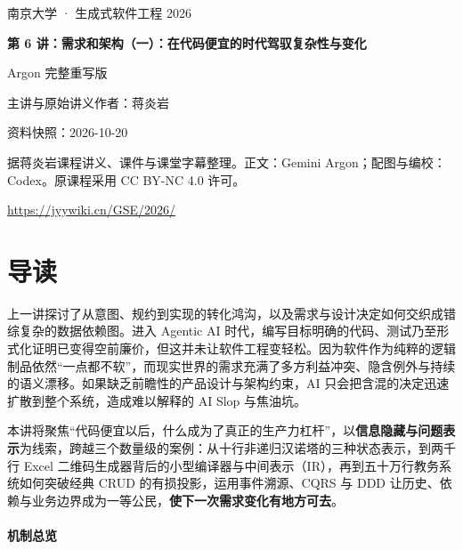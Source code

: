 \documentclass[UTF8,a4paper,11pt,fontset=fandol]{ctexart}
\begin{document}
\begin{titlepage}\centering\vspace*{25mm}

{\Large 南京大学 · 生成式软件工程 2026\par}\vspace{12mm}

{\Huge\bfseries 第 6 讲：需求和架构（一）：在代码便宜的时代驾驭复杂性与变化\par}\vspace{10mm}

{\Large Argon 完整重写版\par}\vspace{10mm}

主讲与原始讲义作者：蒋炎岩\par

资料快照：2026-10-20\par\vfill

据蒋炎岩课程讲义、课件与课堂字幕整理。正文：Gemini Argon；配图与编校：Codex。原课程采用 CC BY-NC 4.0 许可。

\vspace{8mm}\url{https://jyywiki.cn/GSE/2026/}

\end{titlepage}

\tableofcontents\clearpage

\section*{导读}

上一讲探讨了从意图、规约到实现的转化鸿沟，以及需求与设计决定如何交织成错综复杂的数据依赖图。进入 Agentic AI 时代，编写目标明确的代码、测试乃至形式化证明已变得空前廉价，但这并未让软件工程变轻松。因为软件作为纯粹的逻辑制品依然“一点都不软”，而现实世界的需求充满了多方利益冲突、隐含例外与持续的语义漂移。如果缺乏前瞻性的产品设计与架构约束，AI 只会把含混的决定迅速扩散到整个系统，造成难以解释的 AI Slop 与焦油坑。

本讲将聚焦“代码便宜以后，什么成为了真正的生产力杠杆”，以\textbf{信息隐藏与问题表示}为线索，跨越三个数量级的案例：从十行非递归汉诺塔的三种状态表示，到两千行 Excel 二维码生成器背后的小型编译器与中间表示（IR），再到五十万行教务系统如何突破经典 CRUD 的有损投影，运用事件溯源、CQRS 与 DDD 让历史、依赖与业务边界成为一等公民，\textbf{使下一次需求变化有地方可去}。

\paragraph{机制总览}
\end{document}
